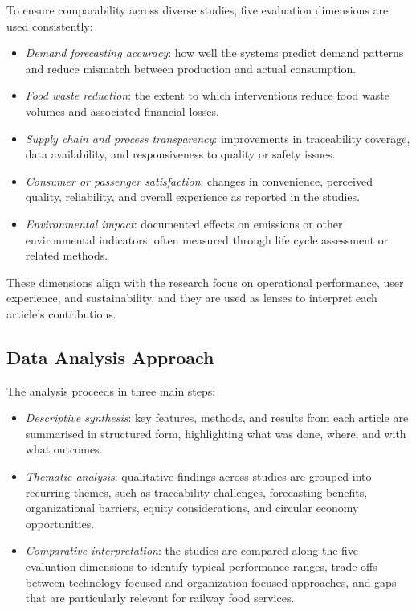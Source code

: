 \documentclass[conference]{IEEEtran}
\begin{document}
To ensure comparability across diverse studies, five evaluation dimensions are used consistently:

\begin{itemize}[leftmargin=*]
\item \textit{Demand forecasting accuracy}: how well the systems predict demand patterns and reduce mismatch between production and actual consumption.
\item \textit{Food waste reduction}: the extent to which interventions reduce food waste volumes and associated financial losses.
\item \textit{Supply chain and process transparency}: improvements in traceability coverage, data availability, and responsiveness to quality or safety issues.
\item \textit{Consumer or passenger satisfaction}: changes in convenience, perceived quality, reliability, and overall experience as reported in the studies.
\item \textit{Environmental impact}: documented effects on emissions or other environmental indicators, often measured through life cycle assessment or related methods.
\end{itemize}

These dimensions align with the research focus on operational performance, user experience, and sustainability, and they are used as lenses to interpret each article’s contributions.

\subsection{Data Analysis Approach}

The analysis proceeds in three main steps:

\begin{itemize}[leftmargin=*]
\item \textit{Descriptive synthesis}: key features, methods, and results from each article are summarised in structured form, highlighting what was done, where, and with what outcomes.
\item \textit{Thematic analysis}: qualitative findings across studies are grouped into recurring themes, such as traceability challenges, forecasting benefits, organizational barriers, equity considerations, and circular economy opportunities.
\item \textit{Comparative interpretation}: the studies are compared along the five evaluation dimensions to identify typical performance ranges, trade-offs between technology-focused and organization-focused approaches, and gaps that are particularly relevant for railway food services.
\end{itemize}
\end{document}
